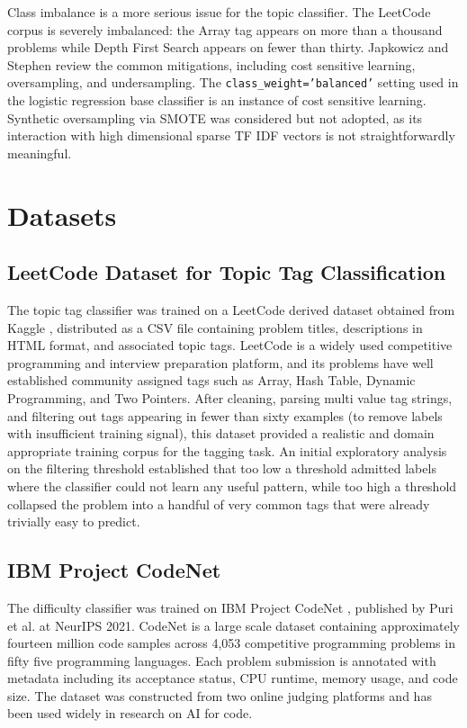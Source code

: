 Class imbalance is a more serious issue for the topic classifier. The
LeetCode corpus is severely imbalanced: the Array tag appears on more
than a thousand problems while Depth First Search appears on fewer
than thirty. Japkowicz and Stephen \cite{japkowicz2002imbalance}
review the common mitigations, including cost sensitive learning,
oversampling, and undersampling. The \texttt{class\_weight='balanced'}
setting used in the logistic regression base classifier is an instance
of cost sensitive learning. Synthetic oversampling via SMOTE
\cite{chawla2002smote} was considered but not adopted, as its
interaction with high dimensional sparse TF IDF vectors is not
straightforwardly meaningful.

\section{Datasets}

\subsection{LeetCode Dataset for Topic Tag Classification}

The topic tag classifier was trained on a LeetCode derived dataset obtained from Kaggle \cite{kaggleleetcode2025}, distributed as a CSV file containing problem titles, descriptions in HTML format, and associated topic tags. LeetCode is a widely used competitive programming and interview preparation platform, and its problems have well established community assigned tags such as Array, Hash Table, Dynamic Programming, and Two Pointers. After cleaning, parsing multi value tag strings, and filtering out tags appearing in fewer than sixty examples (to remove labels with insufficient training signal), this dataset provided a realistic and domain appropriate training corpus for the tagging task. An initial exploratory analysis on the filtering threshold established that too low a threshold admitted labels where the classifier could not learn any useful pattern, while too high a threshold collapsed the problem into a handful of very common tags that were already trivially easy to predict.

\subsection{IBM Project CodeNet}

The difficulty classifier was trained on IBM Project CodeNet
\cite{puri2021codenet}, published by Puri et al. at NeurIPS 2021.
CodeNet is a large scale dataset containing approximately fourteen
million code samples across 4,053 competitive programming problems in
fifty five programming languages. Each problem submission is annotated
with metadata including its acceptance status, CPU runtime, memory
usage, and code size. The dataset was constructed from two online
judging platforms and has been used widely in research on AI for code.

